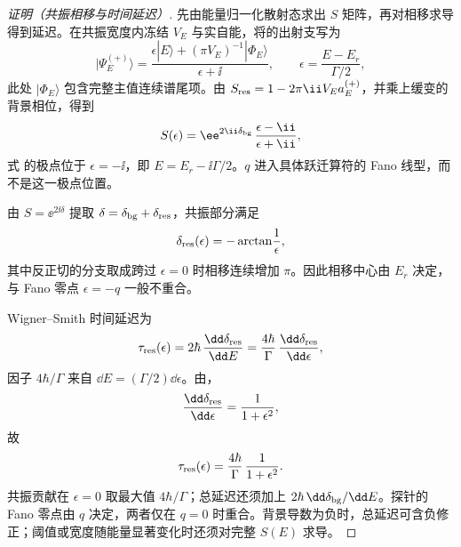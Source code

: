 \begin{proof}[证明（共振相移与时间延迟）]

先由能量归一化散射态求出 $S$ 矩阵，再对相移求导得到延迟。在共振宽度内冻结 $V_E$ 与实自能，将的出射支写为
\begin{equation}
|\Psi_E^{(+)}\rangle
=\frac{\epsilon|E\rangle+(\pi V_E)^{-1}|\Phi_E\rangle}{\epsilon+\ii},
\qquad
\epsilon=\frac{E-E_r}{\Gamma/2},
\label{eq:fano-state-s-matrix}
\end{equation}
此处 $|\Phi_E\rangle$ 包含完整主值连续谱尾项。由 $S_{\rm res}=1-2\pi\ii V_Ea_E^{(+)}$，并乘上缓变的背景相位，得到
\begin{equation}
S(\epsilon)=\ee^{2\ii\delta_{\rm bg}}\,\frac{\epsilon-\ii}{\epsilon+\ii},
\label{eq:fano-s-matrix}
\end{equation}
式  的极点位于 \(\epsilon=-\ii\)，即 \(E=E_r-\ii\Gamma/2\)。\(q\) 进入具体跃迁算符的 Fano 线型，而不是这一极点位置。

由 \(S=\ee^{2\ii\delta}\) 提取 \(\delta=\delta_{\rm bg}+\delta_{\rm res}\)，共振部分满足
\begin{equation}
\delta_{\rm res}(\epsilon)=-\arctan\!\frac{1}{\epsilon},
\label{eq:fano-resonance-phase-shift}
\end{equation}
其中反正切的分支取成跨过 \(\epsilon=0\) 时相移连续增加 \(\pi\)。因此相移中心由 \(E_r\) 决定，与 Fano 零点 \(\epsilon=-q\) 一般不重合。

Wigner--Smith 时间延迟为
\begin{equation}
\tau_{\rm res}(\epsilon)=2\hbar\,\frac{\dd\delta_{\rm res}}{\dd E}
=\frac{4\hbar}{\Gamma}\,\frac{\dd\delta_{\rm res}}{\dd\epsilon},
\label{eq:wigner-smith-definition}
\end{equation}
因子 \(4\hbar/\Gamma\) 来自 \(\dd E=(\Gamma/2)\dd\epsilon\)。由，
\begin{equation}
\frac{\dd\delta_{\rm res}}{\dd\epsilon}
=\frac{1}{1+\epsilon^2},
\end{equation}
故
\begin{equation}
\tau_{\rm res}(\epsilon)=\frac{4\hbar}{\Gamma}\,\frac{1}{1+\epsilon^2}.
\label{eq:fano-wigner-smith-delay}
\end{equation}
共振贡献在 $\epsilon=0$ 取最大值 $4\hbar/\Gamma$；总延迟还须加上 $2\hbar\,\dd\delta_{\rm bg}/\dd E$。探针的 Fano 零点由 $q$ 决定，两者仅在 $q=0$ 时重合。背景导数为负时，总延迟可含负修正；阈值或宽度随能量显著变化时还须对完整 $S(E)$ 求导。

\end{proof}

